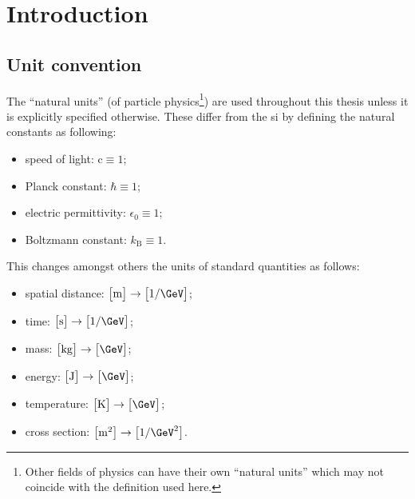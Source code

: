 \chapter{Introduction}

\section{Unit convention}

The ``natural units'' (of particle physics\footnote{Other fields of physics can have their own ``natural units'' which may not coincide with the definition used here.}) are used throughout this thesis unless it is explicitly specified otherwise. These differ from the \gls{si} by defining the natural constants as following:

\begin{itemize}
\item speed of light: $\mathrm{c}\equiv 1$;
\item Planck constant: $\hbar\equiv 1$;
\item electric permittivity: $\epsilon_{0}\equiv 1$;
\item Boltzmann constant: $k_\mathrm{B}\equiv 1$.
\end{itemize}

This changes amongst others the units of standard quantities as follows:

\begin{itemize}
\item spatial distance: $\big[\mathrm{m}\big]\rightarrow \big[1/\GeV\big]$;
\item time: $\big[\mathrm{s}\big]\rightarrow \big[1/\GeV\big]$;
\item mass: $\big[\mathrm{kg}\big]\rightarrow \big[\GeV\big]$;
\item energy: $\big[\mathrm{J}\big]\rightarrow \big[\GeV\big]$;
\item temperature: $\big[\mathrm{K}\big]\rightarrow \big[\GeV\big]$;
\item cross section: $\big[\mathrm{m}^{2}\big]\rightarrow \big[1/\GeV^{2}\big]$.
\end{itemize}

